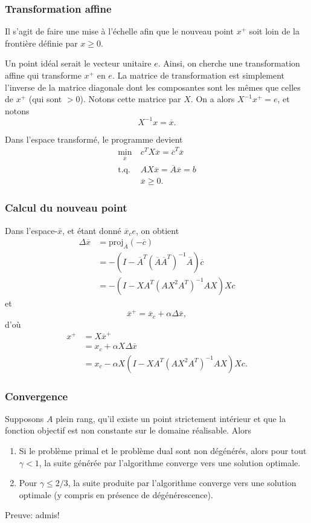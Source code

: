 \documentclass[usepdftitle=false]{beamer}
\begin{document}
\begin{frame}
\frametitle{Transformation affine}

Il s'agit de faire une mise à l'échelle afin que le nouveau point $x^+$ soit loin de la frontière définie par $x \geq 0$.

\mbox{}

Un point idéal serait le vecteur unitaire $e$. Ainsi, on cherche une transformation
affine qui transforme $x^+$ en $e$.
La matrice de transformation est simplement l'inverse de la matrice diagonale dont les
composantes sont les mêmes que celles de $x^+$ (qui sont $>0$).
Notons cette matrice par $X$.
On a alors $X^{-1}x^+ = e$, et notons
$$
X^{-1}x = \overline{x}.
$$

\mbox{}

Dans l'espace transformé, le programme devient
\begin{align*}
\min_{\overline{x}} \ & c^TX\overline{x} = \overline{c}^T\overline{x} \\
\mbox{t.q. } & AX\overline{x} = \overline{A}\overline{x} = b\\
& \overline{x} \geq 0.
\end{align*}

\end{frame}

\begin{frame}
\frametitle{Calcul du nouveau point}

Dans l'espace-$\overline{x}$, et étant donné $\overline{x}_c e$, on obtient
\begin{align*}
\Delta\overline{x} &= \text{proj}_{\overline{A}}(-\overline{c}) \\
& = -(I - \overline{A}^T(\overline{A}\overline{A}^T)^{-1}\overline{A})\overline{c} \\
& = -(I - XA^T(AX^2A^T)^{-1}AX)Xc
\end{align*}
et
$$
\overline{x}^+ = \overline{x}_c + \alpha \Delta \overline{x},
$$
d'où
\begin{align*}
x^+ &= X\overline{x}^+ \\
&= x_c + \alpha X \Delta \overline{x} \\
&= x_c - \alpha X(I - XA^T(AX^2A^T)^{-1}AX)Xc.
\end{align*}

\end{frame}

\begin{frame}
\frametitle{Convergence}

Supposons $A$ plein rang, qu'il existe un point strictement intérieur et que la fonction objectif est non constante sur le domaine réalisable.
Alors
\begin{enumerate}
\item
Si le problème primal et le problème dual sont non dégénérés, alors pour tout $\gamma < 1$, la suite générée par l'algorithme converge vers une solution optimale.
\item
Pour $\gamma \leq 2/3$, la suite produite par l’algorithme converge
vers une solution optimale (y compris en présence de dégénérescence).
\end{enumerate}

Preuve: admis!

\end{frame}
\end{document}
